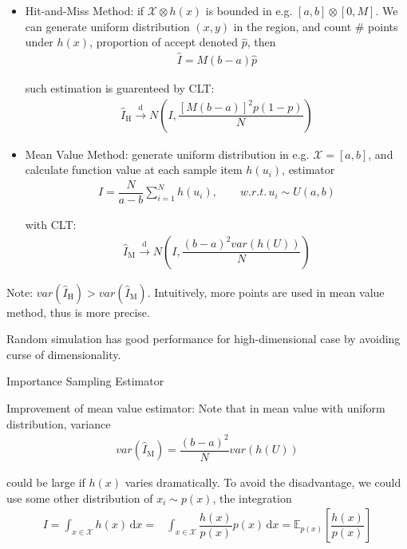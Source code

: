\begin{itemize}[topsep=2pt,itemsep=0pt]
    \item Hit-and-Miss Method: if $ \mathcal{X}\otimes h(x) $ is bounded in e.g. $ [a,b]\otimes [0,M] $. We can generate uniform distribution $ (x,y) $ in the region, and count \# points under $ h(x) $, proportion of accept denoted $ \hat{p} $, then
    \begin{align}
        \hat{I}=M(b-a)\hat{p} 
    \end{align}

    such estimation is guarenteed by CLT:
    \begin{align}
        \hat{I}_\mathrm{H} \xrightarrow[]{\mathrm{d}} N\left( I,\dfrac{[M(b-a)]^2p(1-p)}{N} \right)
    \end{align}
    
    
    \item Mean Value Method: generate uniform distribution in e.g. $ \mathcal{X}=[a,b] $, and calculate function value at each sample item $ h(u_i) $, estimator
    \begin{align}
        \hat{I}=\dfrac{N}{a-b}\sum_{i=1}^Nh(u_i) ,\qquad w.r.t.\, u_i\sim U(a,b)
    \end{align}
    
    with CLT:
    \begin{align}
         \hat{I}_\mathrm{M} \xrightarrow[]{\mathrm{d}} N\left(I,\dfrac{(b-a)^2var(h(U))}{N}\right)
    \end{align}


\end{itemize}

    Note: $ var(\hat{I}_\mathrm{H} )>var(\hat{I}_\mathrm{M} ) $. Intuitively, more points are used in mean value method, thus is more precise.

    Random simulation has good performance for high-dimensional case by avoiding curse of dimensionality.

\begin{point}
    Importance Sampling Estimator
\end{point}

    Improvement of mean value estimator: Note that in mean value with uniform distribution, variance
    \begin{align}
        var(\hat{I}_\mathrm{M}) =\dfrac{(b-a)^2}{N}var(h(U))
    \end{align}

    could be large if $ h(x) $ varies dramatically. To avoid the disadvantage, we could use some other distribution of $ x_i\sim p(x) $, the integration
    \begin{align}
        I=\int_{x\in \mathcal{X} } h(x) \,\mathrm{d}x =&\int _{x\in \mathcal{X}} \dfrac{h(x)}{p(x)}p(x) \,\mathrm{d}x=\mathbb{E}_{p(x)}\left[\dfrac{h(x)}{p(x)}\right]
    \end{align}

